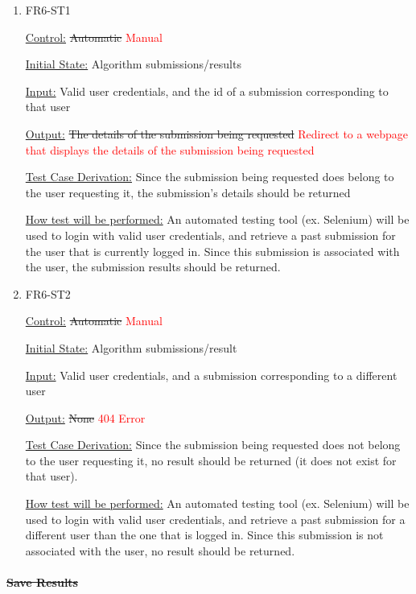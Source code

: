 \documentclass[12pt, titlepage]{article}
\begin{document}
\begin{enumerate}

\item{FR6-ST1\\}

\underline{Control:} \sout{Automatic} \textcolor{red} {Manual}

\underline{Initial State:} Algorithm submissions/results

\underline{Input:} Valid user credentials, and the id of a submission corresponding to that user

\underline{Output:} \sout{The details of the submission being requested} \textcolor{red} {Redirect to a webpage that displays the details of the submission being requested}

\underline{Test Case Derivation:} Since the submission being requested does belong to the user requesting it, the submission’s details should be returned

\underline{How test will be performed:} An automated testing tool (ex. Selenium) will be used to login with valid user credentials, and retrieve a past submission for the user that is currently logged in. Since this submission is associated with the user, the submission results should be returned.
					
\item{FR6-ST2\\}

\underline{Control:} \sout{Automatic} \textcolor{red} {Manual}

\underline{Initial State:} Algorithm submissions/result

\underline{Input:} Valid user credentials, and a submission corresponding to a different user

\underline{Output:} \sout{None} \textcolor{red} {404 Error}

\underline{Test Case Derivation:} Since the submission being requested does not belong to the user requesting it, no result should be returned (it does not exist for that user).

\underline{How test will be performed:} An automated testing tool (ex. Selenium) will be used to login with valid user credentials, and retrieve a past submission for a different user than the one that is logged in. Since this submission is not associated with the user, no result should be returned.

\end{enumerate}

\paragraph{\sout{Save Results}}
\end{document}

